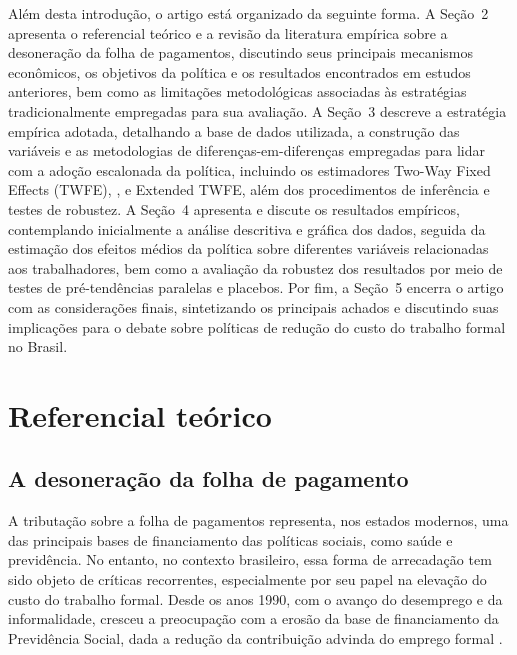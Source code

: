 \documentclass[12pt,a4paper,oneside]{article}
\begin{document}
		Além desta introdução, o artigo está organizado da seguinte forma. A Seção~2 apresenta o referencial teórico e a revisão da literatura empírica sobre a desoneração da folha de pagamentos, discutindo seus principais mecanismos econômicos, os objetivos da política e os resultados encontrados em estudos anteriores, bem como as limitações metodológicas associadas às estratégias tradicionalmente empregadas para sua avaliação. A Seção~3 descreve a estratégia empírica adotada, detalhando a base de dados utilizada, a construção das variáveis e as metodologias de diferenças-em-diferenças empregadas para lidar com a adoção escalonada da política, incluindo os estimadores Two-Way Fixed Effects (TWFE), \citet{Callaway2021}, \citet{Sun2021} e Extended TWFE, além dos procedimentos de inferência e testes de robustez. A Seção~4 apresenta e discute os resultados empíricos, contemplando inicialmente a análise descritiva e gráfica dos dados, seguida da estimação dos efeitos médios da política sobre diferentes variáveis relacionadas aos trabalhadores, bem como a avaliação da robustez dos resultados por meio de testes de pré-tendências paralelas e placebos. Por fim, a Seção~5 encerra o artigo com as considerações finais, sintetizando os principais achados e discutindo suas implicações para o debate sobre políticas de redução do custo do trabalho formal no Brasil.
		

	

		\section{Referencial teórico}
		
		\subsection{A desoneração da folha de pagamento}
		
		A tributação sobre a folha de pagamentos representa, nos estados modernos, uma das principais bases de financiamento das políticas sociais, como saúde e previdência. No entanto, no contexto brasileiro, essa forma de arrecadação tem sido objeto de críticas recorrentes, especialmente por seu papel na elevação do custo do trabalho formal. Desde os anos 1990, com o avanço do desemprego e da informalidade, cresceu a preocupação com a erosão da base de financiamento da Previdência Social, dada a redução da contribuição advinda do emprego formal \citep{ansiliero2008}.
		
\end{document}
